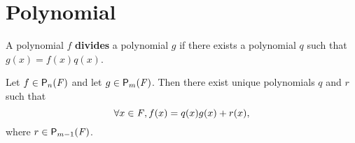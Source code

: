 \chapter{Polynomial}\label{ch:e}

\begin{defn}\label{e.0.1}
	A polynomial \(f\) \textbf{divides} a polynomial \(g\) if there exists a polynomial \(q\) such that \(g(x) = f(x) q(x)\).
\end{defn}

\begin{thm}\label{e.1}
	Let \(f \in \ps[n]{\F}\) and let \(g \in \ps[m]{\F}\).
	Then there exist unique polynomials \(q\) and \(r\) such that
	\begin{equation}\label{eq:e.0.1}
		\forall x \in \mathit{F}, f(x) = q(x) g(x) + r(x),
	\end{equation}
	where \(r \in \ps[m - 1]{\F}\).
\end{thm}


